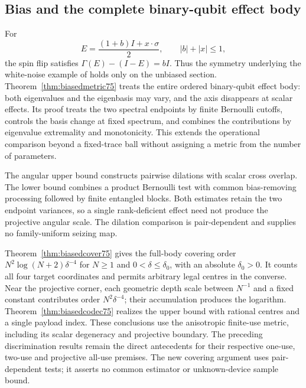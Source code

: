 \subsection{Bias and the complete binary-qubit effect body}
For
\[
 E=\frac{(1+b)I+x\cdot\sigma}{2},\qquad |b|+|x|\leq1,
\]
the spin flip satisfies $\Gamma(E)-(I-E)=bI$. Thus the symmetry
underlying the white-noise example of \cite{SZ74} holds only on the
unbiased section. Theorem~\ref{thm:biasedmetric75} treats the entire
ordered binary-qubit effect body: both eigenvalues and the eigenbasis
may vary, and the axis disappears at scalar effects. Its proof treats
the two spectral endpoints by finite Bernoulli cutoffs, controls the
basis change at fixed spectrum, and combines the contributions by
eigenvalue extremality and monotonicity. This extends the operational
comparison beyond a fixed-trace ball without assigning a metric from
the number of parameters.

The angular upper bound constructs pairwise dilations with scalar
cross overlap. The lower bound combines a product Bernoulli test with
common bias-removing processing followed by finite entangled blocks.
Both estimates retain the two endpoint variances, so a single
rank-deficient effect need not produce the projective angular scale.
The dilation comparison is pair-dependent and supplies no
family-uniform seizing map.

Theorem~\ref{thm:biasedcover75} gives the full-body covering order
$N^2\log(N+2)\delta^{-4}$ for $N\ge1$ and
$0<\delta\le\delta_0$, with an absolute $\delta_0>0$.
It counts all four target coordinates and permits arbitrary legal
centres in the converse. Near the projective corner, each geometric
depth scale between $N^{-1}$ and a fixed constant contributes order
$N^2\delta^{-4}$; their accumulation produces the logarithm.
Theorem~\ref{thm:biasedcodec75} realizes the upper bound with rational
centres and a single payload index. These conclusions use the
anisotropic finite-use metric, including its scalar degeneracy and
projective boundary.
The preceding discrimination results remain the direct antecedents
for their respective one-use, two-use and projective all-use premises.
The new covering argument uses pair-dependent tests; it asserts no
common estimator or unknown-device sample bound.
